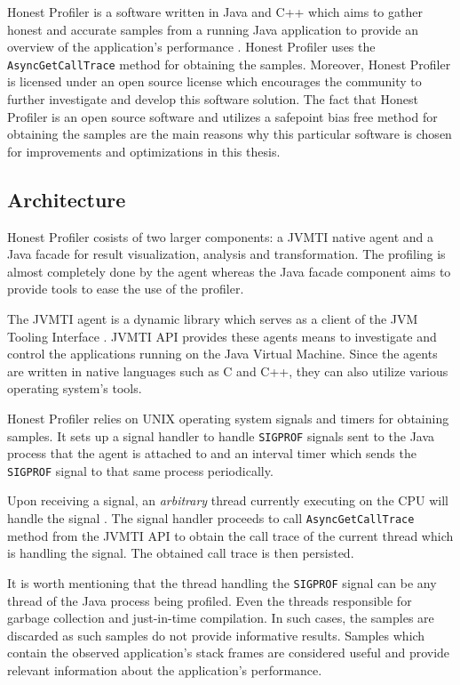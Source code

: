 \documentclass[..thesis.tex]{subfiles}
\begin{document}
Honest Profiler is a software written in Java and C++ which aims to gather honest and accurate samples from a running Java application to provide an overview of the application's performance \cite{hon_prof}. Honest Profiler uses the \texttt{Async\-Get\-Call\-Trace} method for obtaining the samples. Moreover, Honest Profiler is licensed under an open source license which encourages the community to further investigate and develop this software solution. The fact that Honest Profiler is an open source software and utilizes a safepoint bias free method for obtaining the samples are the main reasons why this particular software is chosen for improvements and optimizations in this thesis.

\subsection{Architecture}
Honest Profiler cosists of two larger components: a JVMTI native agent and a Java facade for result visualization, analysis and transformation. The profiling is almost completely done by the agent whereas the Java facade component aims to provide tools to ease the use of the profiler.

The JVMTI agent is a dynamic library which serves as a client of the JVM Tooling Interface \cite{jvmtm}. JVMTI API provides these agents means to investigate and control the applications running on the Java Virtual Machine. Since the agents are written in native languages such as C and C++, they can also utilize various operating system's tools.

Honest Profiler relies on UNIX operating system signals and timers for obtaining samples.
It sets up a signal handler to handle \texttt{SIGPROF} signals sent to the Java process that the agent is attached to and an interval timer which sends the \texttt{SIGPROF} signal to that same process periodically. 

Upon receiving a signal, an \textit{arbitrary} thread currently executing on the CPU will handle the signal \cite{stevens_advanced_2013}. The signal handler proceeds to call \texttt{AsyncGetCallTrace} method from the JVMTI API to obtain the call trace of the current thread which is handling the signal. The obtained call trace is then persisted.

It is worth mentioning that the thread handling the \texttt{SIGPROF} signal can be any thread of the Java process being profiled. Even the threads responsible for garbage collection and just-in-time compilation. In such cases, the samples are discarded as such samples do not provide informative results. Samples which contain the observed application's stack frames are considered useful and provide relevant information about the application's performance.
\end{document}

